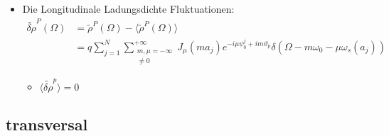 \documentclass[12pt]{article}%
\renewcommand{\theta}{\vartheta}
\newcommand{\itemf}{\item[$\circ$]}
\begin{document}
\begin{itemize}
	
	\item  Die Longitudinale Ladungsdichte Fluktuationen: 
	\begin{align}
		\label{eq:lcdf_bunch_ft}
		 \widetilde{\delta \rho}^P(\Omega) &= \widetilde{\rho}^P(\Omega) - \langle \widetilde{\rho}^P(\Omega)\rangle \\
		 &=  q \sum_{j=1}^{N} \sum_{\substack{m,\mu = -\infty \\ \neq 0}}^{+\infty}J_\mu(ma_j)e^{-i\mu \psi_0^j+im\theta_p}\delta(\Omega-m\omega_0-\mu \omega_s(a_j))
	\end{align}
	\begin{itemize}
		\itemf $\langle \widetilde{\delta\rho}^p \rangle = 0$ 
	\end{itemize}
\end{itemize}


\subsection{transversal} 
\end{document}
